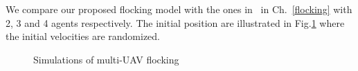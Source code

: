 We compare our proposed flocking model with the ones in~\cite{Vicsek1995,CuckerSmale2007,CuckerDong2010} in Ch.~\ref{flocking} with 2, 3 and 4 agents respectively. The initial position are illustrated in Fig.\ref{fig:simulate_flocking} where the initial velocities are randomized.
\begin{figure}[htb]
  \centering
  \caption{Simulations of multi-UAV flocking}\label{fig:simulate_flocking}
\end{figure}

